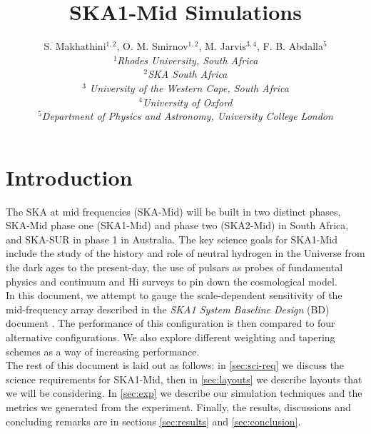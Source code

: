 \documentclass[sfheadings,a4paper,10pt,floats,floatfix]{article}
\title{SKA1-Mid Simulations}
\author{S. Makhathini$^{1,2}$, O. M. Smirnov$^{1,2}$, M. Jarvis$^{3,4}$, F. B. Abdalla$^5$ \\{\footnotesize \it $^1$Rhodes
University, South Africa}\\ {\footnotesize \it  $^2$SKA South Africa}\\ 
{\footnotesize \it $^3$ University of the Western Cape, South Africa} \\ {\footnotesize \it $^4$University of Oxford} \\
{\footnotesize \it $^5$Department of Physics and Astronomy, University College London}}
\begin{document}
\maketitle
\section{Introduction}
The SKA at mid frequencies (SKA-Mid) will be built in two distinct phases, SKA-Mid phase one (SKA1-Mid) and phase two (SKA2-Mid)
in South Africa, and SKA-SUR in phase 1 in Australia. The key science goals for SKA1-Mid include the study of the history and role
of neutral hydrogen in the Universe from the dark ages to the present-day, the use of pulsars as probes of fundamental physics
\cite{bd} and continuum and H{\sc i} surveys to pin down the cosmological model. \\In this document, we attempt to gauge the
scale-dependent sensitivity of the mid-frequency array described in the {\it SKA1 System Baseline Design} (BD) document \cite{bd}.
The performance of this configuration is then compared to four alternative configurations. We also explore different weighting and
tapering schemes as a way of increasing performance.\\ The rest of this document is laid out as follows: in \autoref{sec:sci-req}
we discuss the science requirements for SKA1-Mid, then in \autoref{sec:layouts} we describe layouts that we will be considering.
In \autoref{sec:exp} we describe our simulation techniques and the metrics we generated from the experiment. Finally, the results,
discussions and concluding remarks are in sections \autoref{sec:results} and \autoref{sec:conclusion}.
\end{document}
